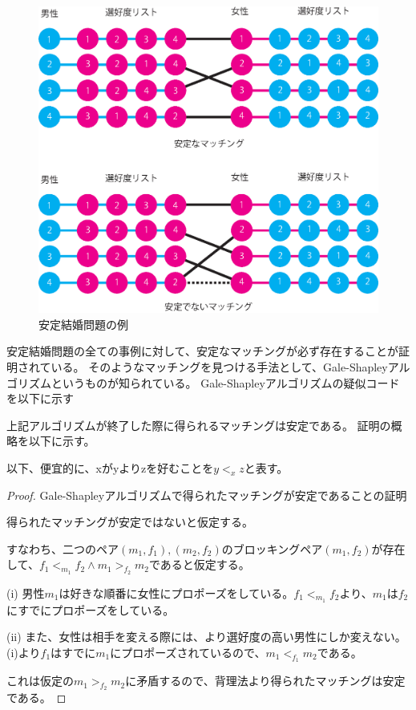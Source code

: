 \documentclass[12pt]{jarticle}
\begin{document}
\begin{figure}
  \begin{center}
    \includegraphics[scale=0.5]{image/match.eps}
  \end{center}
  \caption{安定結婚問題の例}
  \label{match}
\end{figure}

安定結婚問題の全ての事例に対して、安定なマッチングが必ず存在することが証明されている。
\def\gsa{Gale-Shapleyアルゴリズム}
そのようなマッチングを見つける手法として、\gsa というものが知られている。
\gsa の疑似コードを以下に示す



上記アルゴリズムが終了した際に得られるマッチングは安定である。
証明の概略を以下に示す。

以下、便宜的に、xがyよりzを好むことを$y <_x z$と表す。

\begin{proof}
\gsa で得られたマッチングが安定であることの証明

得られたマッチングが安定ではないと仮定する。

すなわち、二つのペア$(m_1, f_1), (m_2, f_2)$のブロッキングペア$(m_1, f_2)$が存在して、$f_1 <_{m_1} f_2 \land m_1 >_{f_2}m_2$であると仮定する。

(i) 男性$m_1$は好きな順番に女性にプロポーズをしている。$f_1 <_{m_1} f_2$より、$m_1$は$f_2$にすでにプロポーズをしている。

(ii) また、女性は相手を変える際には、より選好度の高い男性にしか変えない。(i)より$f_1$はすでに$m_1$にプロポーズされているので、$m_1 <_{f_1} m_2$である。

これは仮定の$m_1 >_{f_2}m_2$に矛盾するので、背理法より得られたマッチングは安定である。

\end{proof}
\end{document}
